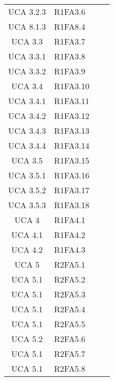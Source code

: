 {\begin{longtable}{ c C{4cm} c c}
UCA 3.2.3 & R1FA3.6\\

UCA 8.1.3 & R1FA8.4\\

UCA 3.3 & R1FA3.7\\

UCA 3.3.1 & R1FA3.8\\

UCA 3.3.2 & R1FA3.9\\

UCA 3.4 & R1FA3.10\\

UCA 3.4.1 & R1FA3.11\\

UCA 3.4.2 & R1FA3.12\\

UCA 3.4.3 & R1FA3.13\\


UCA 3.4.4 & R1FA3.14\\

UCA 3.5 & R1FA3.15\\

UCA 3.5.1 & R1FA3.16\\

UCA 3.5.2 & R1FA3.17\\

UCA 3.5.3 & R1FA3.18\\

UCA 4 & R1FA4.1\\

UCA 4.1 & R1FA4.2\\

UCA 4.2 & R1FA4.3\\

UCA 5 & R2FA5.1\\

UCA 5.1 & R2FA5.2\\


UCA 5.1 & R2FA5.3\\

UCA 5.1 & R2FA5.4\\

UCA 5.1 & R2FA5.5\\

UCA 5.2 & R2FA5.6\\

UCA 5.1 & R2FA5.7\\

UCA 5.1 & R2FA5.8\\


\end{longtable}}
